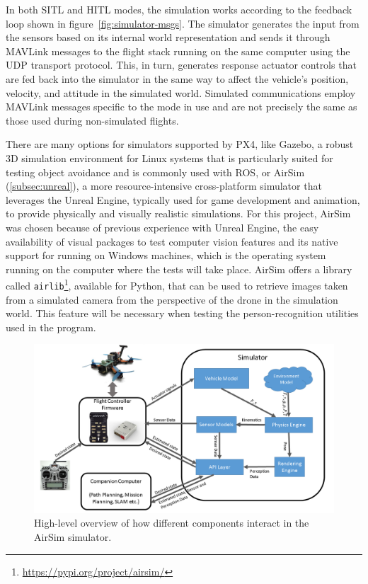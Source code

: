 In both SITL and HITL modes, the simulation works according to the feedback loop shown in figure~\ref{fig:simulator-msgs}. 
The simulator generates the input from the sensors based on its internal world representation and sends it through MAVLink messages to the flight stack running on the same computer using the UDP transport protocol.
This, in turn, generates response actuator controls that are fed back into the simulator in the same way to affect the vehicle's position, velocity, and attitude in the simulated world.
Simulated communications employ MAVLink messages specific to the mode in use and are not precisely the same as those used during non-simulated flights.

There are many options for simulators supported by PX4, like Gazebo, a robust 3D simulation environment for Linux systems that is particularly suited for testing object avoidance and is commonly used with ROS, or AirSim (\ref{subsec:unreal}), a more resource-intensive cross-platform simulator that leverages the Unreal Engine, typically used for game development and animation, to provide physically and visually realistic simulations.
For this project, AirSim was chosen because of previous experience with Unreal Engine, the easy availability of visual packages to test computer vision features and its native support for running on Windows machines, which is the operating system running on the computer where the tests will take place.
AirSim offers a library called \texttt{airlib}\footnote{\url{https://pypi.org/project/airsim/}}, available for Python, that can be used to retrieve images taken from a simulated camera from the perspective of the drone in the simulation world.
This feature will be necessary when testing the person-recognition utilities used in the program.

\begin{figure}
  \centering
  \includegraphics[width=\textwidth,keepaspectratio]{img/airsim-overview.png}
  \caption{High-level overview of how different components interact in the AirSim simulator.}
  \label{fig:airsim-overview}
\end{figure}

